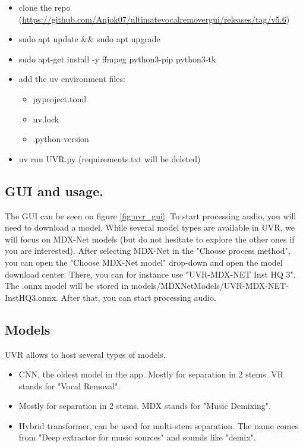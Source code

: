 \documentclass[
10pt, %
a4paper, %
oneside, %
headinclude,footinclude, %
BCOR5mm, %
]{scrartcl}
\begin{document}
\begin{itemize}
    \item clone the repo (\url{https://github.com/Anjok07/ultimatevocalremovergui/releases/tag/v5.6})
    \item sudo apt update \&\& sudo apt upgrade
    \item sudo apt-get install -y ffmpeg python3-pip python3-tk
    \item add the uv environment files:
        \begin{itemize}
            \item pyproject.toml
            \item uv.lock
            \item .python-version
        \end{itemize}
\item uv run UVR.py (requirements.txt will be deleted)
\end{itemize}

\subsection{GUI and usage.}%
\label{app:uvr_gui}

The GUI can be seen on figure \ref{fig:uvr_gui}. To start processing audio, you will need to download a model. While several model types are available in UVR, we will focus on MDX-Net models (but do not hesitate to explore the other ones if you are interested). After selecting MDX-Net in the "Choose process method", you can open the "Choose MDX-Net model" drop-down and open the model download center. There, you can for instance use "UVR-MDX-NET Inst HQ 3". The .onnx model will be stored in models/MDX\textunderscore Net\textunderscore Models/UVR-MDX-NET-Inst\textunderscore HQ\textunderscore 3.onnx. After that, you can start processing audio.

\subsection{Models}%
\label{app:uvr_models}

UVR allows to host several types of models.

\begin{itemize}
    \item[VR architecture] CNN, the oldest model in the app. Mostly for separation in 2 stems. VR stands for "Vocal Removal".
    \item[MDX-Net] Mostly for separation in 2 stems. MDX stands for "Music Demixing".
    \item[demucs] Hybrid transformer, can be used for multi-stem separation. The name comes from "Deep extractor for music sources" and sounds like "demix".
\end{itemize}
\end{document}
